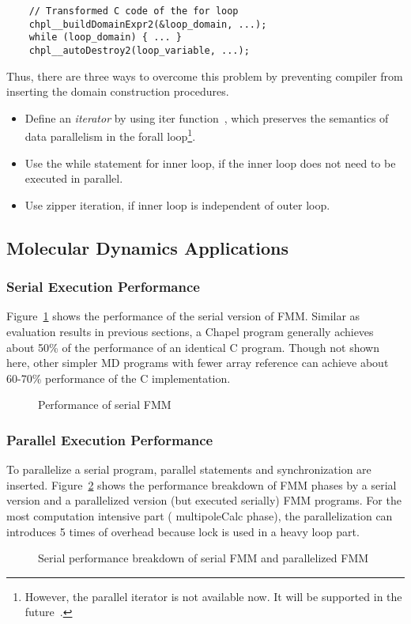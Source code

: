 \begin{lstlisting}
    // Transformed C code of the for loop
    chpl__buildDomainExpr2(&loop_domain, ...);
    while (loop_domain) { ... }
    chpl__autoDestroy2(loop_variable, ...);
\end{lstlisting}

Thus, there are three ways to overcome this problem by preventing compiler from
inserting the domain construction procedures.
\begin{itemize}
  \item Define an {\em iterator} by using {\ic iter} function~\cite{chapelspec},
  which preserves the semantics of data parallelism in the {\ic forall}
  loop\footnote{However, the parallel iterator is not available now. It will be
  supported in the future~\cite{chapelspec}.}. 
  \item Use the {\ic while} statement for inner loop, if the inner loop does not
  need to be executed in parallel.
  \item Use zipper iteration, if inner loop is independent of outer loop.
\end{itemize}

\subsection{Molecular Dynamics Applications}

\subsubsection{Serial Execution Performance}
Figure~\ref{fig:fmm_serial} shows the performance of the serial version of
\ac{FMM}. Similar as evaluation results in previous sections, a Chapel program
generally achieves about 50\% of the performance of an identical C program.
Though not shown here, other simpler \ac{MD} programs with fewer array reference
can achieve about 60-70\% performance of the C implementation.

\begin{figure}[t]
\centering

\caption{Performance of serial \acs{FMM}}
\label{fig:fmm_serial}
\end{figure}

\subsubsection{Parallel Execution Performance}
To parallelize a serial program, parallel statements and synchronization are
inserted. Figure~\ref{fig:fmm_breakdown} shows the performance breakdown of
\ac{FMM} phases by a serial version and a parallelized version (but executed
serially) \ac{FMM} programs. For the most computation intensive part (\ie
{\ic multipoleCalc} phase), the parallelization can introduces 5 times of
overhead because lock is used in a heavy loop part.
\begin{figure}[t]
\centering

\caption{Serial performance breakdown of serial \ac{FMM} and parallelized \ac{FMM}}
\label{fig:fmm_breakdown}
\end{figure}

